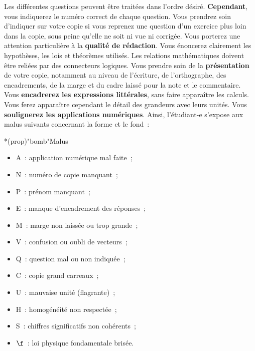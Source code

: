 \documentclass[a4paper, 10pt, garamond]{book}
\begin{document}
{	Les différentes questions peuvent être traitées dans l'ordre désiré.
	\textbf{Cependant}, vous indiquerez le numéro correct de chaque question. Vous
	prendrez soin d'indiquer sur votre copie si vous reprenez une question d'un
	exercice plus loin dans la copie, sous peine qu'elle ne soit ni vue ni corrigée.
	\bigbreak
	Vous porterez une attention particulière à la \textbf{qualité de rédaction}.
	Vous énoncerez clairement les hypothèses, les lois et théorèmes utilisés. Les
	relations mathématiques doivent être reliées par des connecteurs logiques.
	\bigbreak
	Vous prendre soin de la \textbf{présentation} de votre copie, notamment au
	niveau de l'écriture, de l'orthographe, des encadrements, de la marge et du
	cadre laissé pour la note et le commentaire. Vous \textbf{encadrerez les
		expressions littérales}, sans faire apparaître les calculs. Vous ferez
	apparaître cependant le détail des grandeurs avec leurs unités. Vous
	\textbf{soulignerez les applications numériques}.
	\bigbreak
	Ainsi, l'étudiant-e s'expose aux malus suivants concernant la forme et le fond~:
	\begin{tcb}*(prop)"bomb"{Malus}
		\begin{minipage}[t]{0.50\linewidth}
			\begin{itemize}
				\item A~: application numérique mal faite~;
				\item N~: numéro de copie manquant~;
				\item P~: prénom manquant~;
				\item E~: manque d'encadrement des réponses~;
				\item M~: marge non laissée ou trop grande~;
				\item V~: confusion ou oubli de vecteurs~;
			\end{itemize}
		\end{minipage}
		\begin{minipage}[t]{0.50\linewidth}
			\begin{itemize}
				\item Q~: question mal ou non indiquée~;
				\item C~: copie grand carreaux~;
				\item U~: mauvaise unité (flagrante)~;
				\item H~: homogénéité non respectée~;
				\item S~: chiffres significatifs non cohérents~;
				\item $\f$~: loi physique fondamentale brisée.
			\end{itemize}
		\end{minipage}
	\end{tcb}

}
\end{document}
